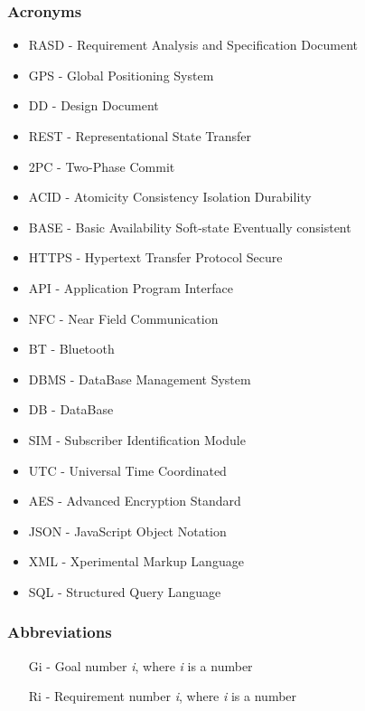 \subsubsection{Acronyms}
\begin{itemize}
\item RASD - Requirement Analysis and Specification Document
\item GPS - Global Positioning System
\item DD - Design Document
\item REST - Representational State Transfer
\item 2PC - Two-Phase Commit
\item ACID - Atomicity Consistency Isolation Durability
\item BASE - Basic Availability Soft-state Eventually consistent
\item HTTPS - Hypertext Transfer Protocol Secure
\item API - Application Program Interface
\item NFC - Near Field Communication
\item BT - Bluetooth
\item DBMS - DataBase Management System
\item DB - DataBase
\item SIM - Subscriber Identification Module
\item UTC - Universal Time Coordinated
\item AES - Advanced Encryption Standard
\item JSON - JavaScript Object Notation
\item XML - Xperimental Markup Language
\item SQL - Structured Query Language
\end{itemize}

\subsubsection{Abbreviations}
\begin{itemize}
\item [Gi] - Goal number \textit{i}, where \textit{i} is a number
\item [Ri] - Requirement number \textit{i}, where \textit{i} is a number
\end{itemize}
